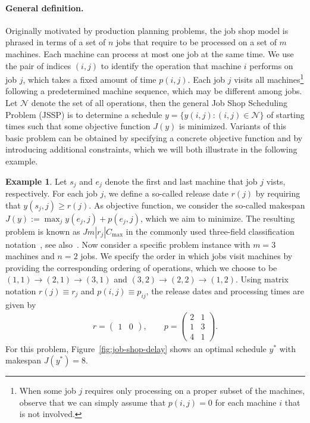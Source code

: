 \documentclass[a4paper]{report}
\theoremstyle{definition}
\newtheorem{eg}{Example}[chapter]
\theoremstyle{plain}
\begin{document}
\paragraph{General definition.}
Originally motivated by production planning problems, the job shop model is
phrased in terms of a set of $n$ jobs that require to be processed on a set of
$m$ machines. Each machine can process at most one job at the same time.
%
We use the pair of indices $(i,j)$ to identify the operation that machine $i$
performs on job $j$, which takes a fixed amount of time $p(i,j)$.
%
Each job $j$ visits all machines\footnote{When some job $j$ requires only
  processing on a proper subset of the machines, observe that we can simply
  assume that $p(i,j) = 0$ for each machine $i$ that is not involved.} following
a predetermined machine sequence, which may be different among jobs.
%
Let $\mathcal{N}$ denote the set of all operations, then the general Job Shop Scheduling
Problem (JSSP) is to determine a schedule $y = \{ y(i,j) : (i,j) \in \mathcal{N} \}$ of
starting times such that some objective function $J(y)$ is minimized.
%
Variants of this basic problem can be obtained by specifying a concrete
objective function and by introducing additional constraints, which we will both
illustrate in the following example.

\begin{eg}\label{eg:job-shop}
  Let $s_{j}$ and $e_{j}$ denote the first and last machine that job $j$ vists, respectively.
  For each job $j$, we define a so-called release date $r(j)$ by requiring that
  $y(s_{j},j) \geq r(j)$.
  As objective function, we consider the so-called makespan
  $J(y) := \max_{j} y(e_{j},j) + p(e_{j}, j)$, which we aim to minimize.
  The resulting problem is known as $Jm|r_{j}|C_{\max}$ in the commonly used
  three-field classification notation~\cite{grahamOptimizationApproximationDeterministic1979}, see also~\cite[Chapter
  2]{pinedoSchedulingTheoryAlgorithms2016}.
  Now consider a specific problem instance with $m=3$ machines and $n=2$ jobs.
  We specify the order in which jobs visit machines by providing the
  corresponding ordering of operations, which we choose to be
  $(1,1) \rightarrow (2,1) \rightarrow (3,1)$ and $(3,2) \rightarrow (2,2) \rightarrow (1,2)$. Using matrix notation
  $r(j) \equiv r_{j}$ and $p(i,j) \equiv p_{ij}$, the release dates and processing
  times are given by
  \begin{align*}
    r =
    \begin{pmatrix}
      1 & 0
    \end{pmatrix} ,
    \quad\quad
    p =
    \begin{pmatrix}
      2 & 1 \\
      1 & 3 \\
      4 & 1
    \end{pmatrix} .
  \end{align*}
  For this problem, Figure~\ref{fig:job-shop-delay} shows an optimal schedule $y^{*}$ with
  makespan $J(y^{*}) = 8$.
\end{eg}
\end{document}
